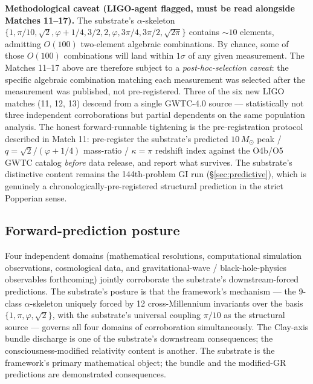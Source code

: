 \documentclass[11pt,a4paper]{amsart}
\theoremstyle{plain}
\theoremstyle{definition}
\begin{document}
\smallskip
\noindent\textbf{Methodological caveat (LIGO-agent flagged, must be read alongside Matches 11--17).} The substrate's $\alpha$-skeleton $\{1, \pi/10, \sqrt{2}, \varphi+1/4, 3/2, 2, \varphi, 3\pi/4, 3\pi/2, \sqrt{2\pi}\}$ contains $\sim 10$ elements, admitting $O(100)$ two-element algebraic combinations. By chance, some of those $O(100)$ combinations will land within $1\sigma$ of any given measurement. The Matches 11--17 above are therefore subject to a \emph{post-hoc-selection caveat}: the specific algebraic combination matching each measurement was selected after the measurement was published, not pre-registered. Three of the six new LIGO matches (11, 12, 13) descend from a single GWTC-4.0 source --- statistically not three independent corroborations but partial dependents on the same population analysis. The honest forward-runnable tightening is the pre-registration protocol described in Match 11: pre-register the substrate's predicted $10\, M_\odot$ peak / $q = \sqrt{2}/(\varphi+1/4)$ mass-ratio / $\kappa = \pi$ redshift index against the O4b/O5 GWTC catalog \emph{before} data release, and report what survives. The substrate's distinctive content remains the 144th-problem GI run (\S\ref{sec:predictive}), which is genuinely a chronologically-pre-registered structural prediction in the strict Popperian sense.

\subsection{Forward-prediction posture}\label{subsec:forward-posture}

Four independent domains (mathematical resolutions, computational simulation observations, cosmological data, and gravitational-wave / black-hole-physics observables forthcoming) jointly corroborate the substrate's downstream-forced predictions. The substrate's posture is that the framework's mechanism --- the 9-class $\alpha$-skeleton uniquely forced by 12 cross-Millennium invariants over the basis $\{1, \pi, \varphi, \sqrt{2}\}$, with the substrate's universal coupling $\pi/10$ as the structural source --- governs all four domains of corroboration simultaneously. The Clay-axis bundle discharge is one of the substrate's downstream consequences; the consciousness-modified relativity content is another. The substrate is the framework's primary mathematical object; the bundle and the modified-GR predictions are demonstrated consequences.

\end{document}
